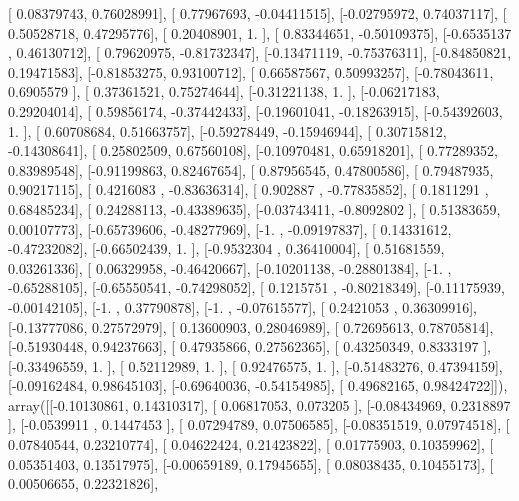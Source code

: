 \documentclass{article}
\begin{document}
       [ 0.08379743,  0.76028991],
       [ 0.77967693, -0.04411515],
       [-0.02795972,  0.74037117],
       [ 0.50528718,  0.47295776],
       [ 0.20408901,  1.        ],
       [ 0.83344651, -0.50109375],
       [-0.6535137 ,  0.46130712],
       [ 0.79620975, -0.81732347],
       [-0.13471119, -0.75376311],
       [-0.84850821,  0.19471583],
       [-0.81853275,  0.93100712],
       [ 0.66587567,  0.50993257],
       [-0.78043611,  0.6905579 ],
       [ 0.37361521,  0.75274644],
       [-0.31221138,  1.        ],
       [-0.06217183,  0.29204014],
       [ 0.59856174, -0.37442433],
       [-0.19601041, -0.18263915],
       [-0.54392603,  1.        ],
       [ 0.60708684,  0.51663757],
       [-0.59278449, -0.15946944],
       [ 0.30715812, -0.14308641],
       [ 0.25802509,  0.67560108],
       [-0.10970481,  0.65918201],
       [ 0.77289352,  0.83989548],
       [-0.91199863,  0.82467654],
       [ 0.87956545,  0.47800586],
       [ 0.79487935,  0.90217115],
       [ 0.4216083 , -0.83636314],
       [ 0.902887  , -0.77835852],
       [ 0.1811291 ,  0.68485234],
       [ 0.24288113, -0.43389635],
       [-0.03743411, -0.8092802 ],
       [ 0.51383659,  0.00107773],
       [-0.65739606, -0.48277969],
       [-1.        , -0.09197837],
       [ 0.14331612, -0.47232082],
       [-0.66502439,  1.        ],
       [-0.9532304 ,  0.36410004],
       [ 0.51681559,  0.03261336],
       [ 0.06329958, -0.46420667],
       [-0.10201138, -0.28801384],
       [-1.        , -0.65288105],
       [-0.65550541, -0.74298052],
       [ 0.1215751 , -0.80218349],
       [-0.11175939, -0.00142105],
       [-1.        ,  0.37790878],
       [-1.        , -0.07615577],
       [ 0.2421053 ,  0.36309916],
       [-0.13777086,  0.27572979],
       [ 0.13600903,  0.28046989],
       [ 0.72695613,  0.78705814],
       [-0.51930448,  0.94237663],
       [ 0.47935866,  0.27562365],
       [ 0.43250349,  0.8333197 ],
       [-0.33496559,  1.        ],
       [ 0.52112989,  1.        ],
       [ 0.92476575,  1.        ],
       [-0.51483276,  0.47394159],
       [-0.09162484,  0.98645103],
       [-0.69640036, -0.54154985],
       [ 0.49682165,  0.98424722]]), array([[-0.10130861,  0.14310317],
       [ 0.06817053,  0.073205  ],
       [-0.08434969,  0.2318897 ],
       [-0.0539911 ,  0.1447453 ],
       [ 0.07294789,  0.07506585],
       [-0.08351519,  0.07974518],
       [ 0.07840544,  0.23210774],
       [ 0.04622424,  0.21423822],
       [ 0.01775903,  0.10359962],
       [ 0.05351403,  0.13517975],
       [-0.00659189,  0.17945655],
       [ 0.08038435,  0.10455173],
       [ 0.00506655,  0.22321826],
\end{document}

